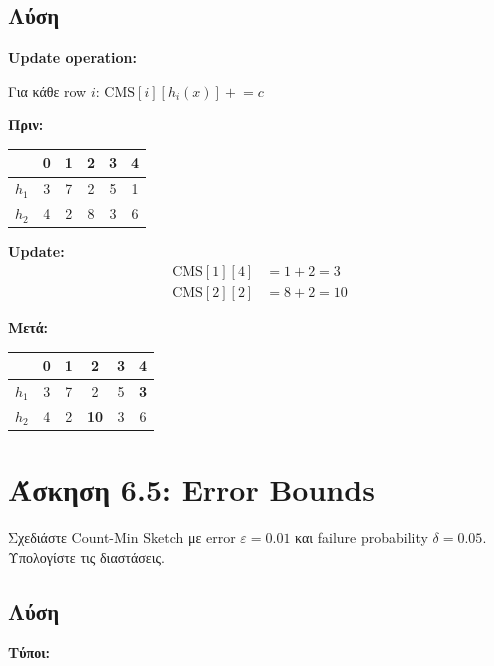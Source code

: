 \subsection*{Λύση}

\textbf{Update operation:}

Για κάθε row $i$: $\text{CMS}[i][h_i(x)] \mathrel{+}= c$

\textbf{Πριν:}
\begin{center}
\begin{tabular}{c|ccccc}
 & 0 & 1 & 2 & 3 & 4 \\
\hline
$h_1$ & 3 & 7 & 2 & 5 & 1 \\
$h_2$ & 4 & 2 & 8 & 3 & 6 \\
\end{tabular}
\end{center}

\textbf{Update:}
\begin{align*}
\text{CMS}[1][4] &= 1 + 2 = 3 \\
\text{CMS}[2][2] &= 8 + 2 = 10
\end{align*}

\textbf{Μετά:}
\begin{center}
\begin{tabular}{c|ccccc}
 & 0 & 1 & 2 & 3 & 4 \\
\hline
$h_1$ & 3 & 7 & 2 & 5 & \textbf{3} \\
$h_2$ & 4 & 2 & \textbf{10} & 3 & 6 \\
\end{tabular}
\end{center}

\section{Άσκηση 6.5: Error Bounds}

\begin{formulabox}[Εκφώνηση]
Σχεδιάστε Count-Min Sketch με error $\varepsilon = 0.01$ και failure probability
$\delta = 0.05$. Υπολογίστε τις διαστάσεις.
\end{formulabox}

\subsection*{Λύση}

\textbf{Τύποι:}


